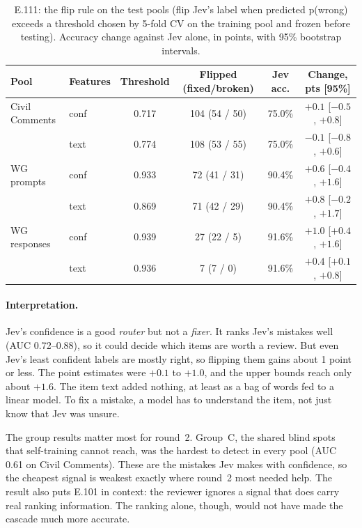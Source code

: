 \documentclass[11pt]{article}
\renewcommand{\_}{\origunderscore\allowbreak}
\begin{document}
\begin{table}[H]
\centering
\small
\caption{E.111: the flip rule on the test pools (flip Jev's label when predicted p(wrong) exceeds a threshold chosen by 5-fold CV on the training pool and frozen before testing). Accuracy change against Jev alone, in points, with 95\% bootstrap intervals.}
\label{tab:e111-flip}
\begin{tabular}{llcccc}
\toprule
Pool & Features & Threshold & Flipped (fixed/broken) & Jev acc. & Change, pts [95\%] \\
\midrule
Civil Comments & conf & 0.717 & 104 (54 / 50) & 75.0\% & $+0.1$ [$-0.5$, $+0.8$] \\
 & text & 0.774 & 108 (53 / 55) & 75.0\% & $-0.1$ [$-0.8$, $+0.6$] \\
\midrule
WG prompts & conf & 0.933 & 72 (41 / 31) & 90.4\% & $+0.6$ [$-0.4$, $+1.6$] \\
 & text & 0.869 & 71 (42 / 29) & 90.4\% & $+0.8$ [$-0.2$, $+1.7$] \\
\midrule
WG responses & conf & 0.939 & 27 (22 / 5) & 91.6\% & $+1.0$ [$+0.4$, $+1.6$] \\
 & text & 0.936 & 7 (7 / 0) & 91.6\% & $+0.4$ [$+0.1$, $+0.8$] \\
\bottomrule
\end{tabular}
\end{table}

\paragraph{Interpretation.}
Jev's confidence is a good \emph{router} but not a \emph{fixer}. It ranks Jev's mistakes well (AUC 0.72--0.88), so it could decide which items are worth a review. But even Jev's least confident labels are mostly right, so flipping them gains about 1 point or less. The point estimates were $+0.1$ to $+1.0$, and the upper bounds reach only about $+1.6$. The item text added nothing, at least as a bag of words fed to a linear model. To fix a mistake, a model has to understand the item, not just know that Jev was unsure.

The group results matter most for round~2. Group~C, the shared blind spots that self-training cannot reach, was the hardest to detect in every pool (AUC 0.61 on Civil Comments). These are the mistakes Jev makes with confidence, so the cheapest signal is weakest exactly where round~2 most needed help. The result also puts E.101 in context: the reviewer ignores a signal that does carry real ranking information. The ranking alone, though, would not have made the cascade much more accurate.
\end{document}

